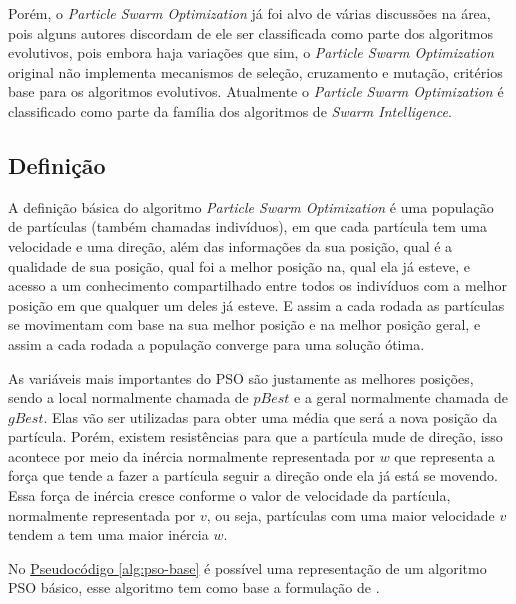         Porém, o \textit{Particle Swarm Optimization} já foi alvo de várias discussões na área, pois alguns autores discordam de ele ser classificada como parte dos algoritmos evolutivos, pois embora haja variações que sim, o \textit{Particle Swarm Optimization} original não implementa mecanismos de seleção, cruzamento e mutação, critérios base para os algoritmos evolutivos.\newline
        Atualmente o \textit{Particle Swarm Optimization} é classificado como parte da família dos algoritmos de \textit{Swarm Intelligence}.


    \subsection{Definição}
        A definição básica do algoritmo \textit{Particle Swarm Optimization} é uma população de partículas (também chamadas indivíduos), em que cada partícula tem uma velocidade e uma direção, além das informações da sua posição, qual é a qualidade de sua posição, qual foi a melhor posição na, qual ela já esteve, e acesso a um conhecimento compartilhado entre todos os indivíduos com a melhor posição em que qualquer um deles já esteve. E assim a cada rodada as partículas se movimentam com base na sua melhor posição e na melhor posição geral, e assim a cada rodada a população converge para uma solução ótima.\newline
        
        As variáveis mais importantes do PSO são justamente as melhores posições, sendo a local normalmente chamada de $pBest$ e a geral normalmente chamada de $gBest$. Elas vão ser utilizadas para obter uma média que será a nova posição da partícula. Porém, existem resistências para que a partícula mude de direção, isso acontece por meio da inércia normalmente representada por $w$ que representa a força que tende a fazer a partícula seguir a direção onde ela já está se movendo. Essa força de inércia cresce conforme o valor de velocidade da partícula, normalmente representada por $v$, ou seja, partículas com uma maior velocidade $v$ tendem a tem uma maior inércia $w$.\newline
        
        No \hyperref[alg:pso-base]{Pseudocódigo \ref{alg:pso-base}} 
        é possível uma representação de um algoritmo PSO básico, esse algoritmo tem como base a formulação de \cite{martinez2009}.
        
